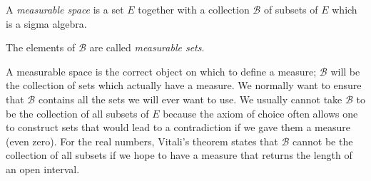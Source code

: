 \documentclass{article}
\begin{document}
A \emph{measurable space} is a set $E$ together with a collection $\mathcal{B}$ of subsets of $E$ which is a sigma algebra.

The elements of $\mathcal{B}$ are called \emph{measurable sets}.

A measurable space is the correct object on which to define a measure; $\mathcal{B}$ will be the collection of sets which actually have a measure.  We normally want to ensure that $\mathcal{B}$ contains all the sets we will ever want to use.  We usually cannot take $\mathcal{B}$ to be the collection of all subsets of $E$ because the axiom of choice often allows one to construct sets that would lead to a contradiction if we gave them a measure (even zero).  For the real numbers, Vitali's theorem states that $\mathcal{B}$ cannot be the collection of all subsets if we hope to have a measure that returns the length of an open interval.
\end{document}
